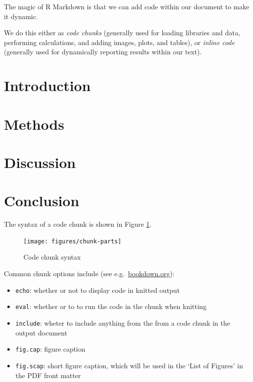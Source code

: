 \documentclass[a4paper, twoside]{templates/ociamthesis}
\providecommand{\tightlist}{%
  \setlength{\itemsep}{0pt}\setlength{\parskip}{0pt}}
\begin{document}
\minitoc 

The magic of R Markdown is that we can add code within our document to make it dynamic.

We do this either as \emph{code chunks} (generally used for loading libraries and data, performing calculations, and adding images, plots, and tables), or \emph{inline code} (generally used for dynamically reporting results within our text).

\hypertarget{introduction-3}{%
\section{Introduction}\label{introduction-3}}

\hypertarget{methods-3}{%
\section{Methods}\label{methods-3}}

\hypertarget{discussion-3}{%
\section{Discussion}\label{discussion-3}}

\hypertarget{conclusion-1}{%
\section{Conclusion}\label{conclusion-1}}

The syntax of a code chunk is shown in Figure \ref{fig:chunk-parts}.

\begin{figure}
\texttt{[image: figures/chunk-parts]} \caption{Code chunk syntax}\label{fig:chunk-parts}
\end{figure}

Common chunk options include (see e.g.~\href{https://bookdown.org/yihui/rmarkdown/r-code.html}{bookdown.org}):

\begin{itemize}
\tightlist
\item
  \texttt{echo}: whether or not to display code in knitted output
\item
  \texttt{eval}: whether or to to run the code in the chunk when knitting
\item
  \texttt{include}: wheter to include anything from the from a code chunk in the output document
\item
  \texttt{fig.cap}: figure caption
\item
  \texttt{fig.scap}: short figure caption, which will be used in the `List of Figures' in the PDF front matter
\end{itemize}
\end{document}

